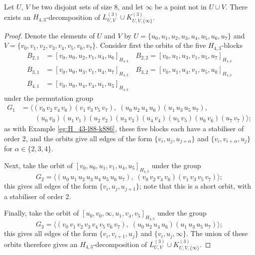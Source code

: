 \begin{subappendices}

\begin{example} \label{eg:H_43-l88-k881}
Let $U$, $V$ be two disjoint sets of size 8, and let $\infty$ be a point not in $U \cup V$.
There exists an $H_{4,3}$-decomposition of $L_{U,V}^{(3)} \cup K_{U,V,\{\infty\}}^{(3)}$.
\end{example}

\begin{proof}
Denote the elements of $U$ and $V$ by $U = \{u_0, u_1, u_2, u_3, u_4, u_5, u_6, u_7\}$ and $V = \{v_0, v_1, v_2, v_3, v_4, v_5, v_6, v_7\}$.
Consider first the orbits of the five $H_{4,3}$-blocks
\begin{align*}
    B_{2,1} &= [v_0, u_0, u_2, v_1, u_4, u_6]_{H_{4,3}} \quad
    B_{2,2} = [v_0, u_1, u_3, v_1, u_5, u_7]_{H_{4,3}} \\
    B_{3,1} &= [v_0, u_0, u_3, v_1, u_4, u_7]_{H_{4,3}} \quad
    B_{3,2} = [v_0, u_1, u_4, v_1, u_5, u_0]_{H_{4,3}} \\
    B_{4,1} &= [v_0, u_0, u_4, v_4, u_1, u_5]_{H_{4,3}}
\end{align*}
under the permutation group
\begin{align*}
    G_1 &= \langle (v_0 \, v_2 \, v_4 \, v_6) (v_1 \, v_3 \, v_5 \, v_7),
    \; (u_0 \, u_2 \, u_4 \, u_6) (u_1 \, u_3 \, u_5 \, u_7), \\
    & \quad \quad (u_0 \, v_0) (u_1 \, v_1) (u_2 \, v_2) (u_3 \, v_3) (u_4 \, v_4)
    (u_5 \, v_5) (u_6 \, v_6) (u_7 \, v_7) \rangle;
\end{align*}
as with Example \ref{eg:H_43-l88-k886}, these five blocks each have a stabiliser of order 2,
  and the orbits give all edges of the form $\{v_i, u_j, u_{j+\alpha}\}$ and $\{v_i, v_{i+\alpha}, u_j\}$ for $\alpha \in \{2,3,4\}$.

Next, take the orbit of $[v_0, u_0, u_1, v_1, u_4, u_5]_{H_{4,3}}$ under the group
\[
    G_2 = \langle (u_0 \, u_1 \, u_2 \, u_3 \, u_4 \, u_5 \, u_6 \, u_7), \;
    (v_0 \, v_2 \, v_4 \, v_6) (v_1 \, v_3 \, v_5 \, v_7)\rangle;
\]
this gives all edges of the form $\{v_i, u_j, u_{j+1}\}$; note that this is a
short orbit, with a stabiliser of order 2.

Finally, take the orbit of $[u_0, v_0, \infty, u_1, v_4, v_5]_{H_{4,3}}$ under the group
\[
    G_3 = \langle (v_0 \, v_1 \, v_2 \, v_3 \, v_4 \, v_5 \, v_6 \, v_7), \;
    (u_0 \, u_2 \, u_4 \, u_6) (u_1 \, u_3 \, u_5 \, u_7)\rangle;
\]
this gives all edges of the form $\{v_i, v_{i+1}, u_j\}$ and $\{v_i, u_j, \infty\}$.
The union of these orbits therefore gives an ${H_{4,3}}$-decomposition of $L_{U,V}^{(3)} \cup K_{U,V,\{\infty\}}^{(3)}$.
\end{proof}

\end{subappendices}
